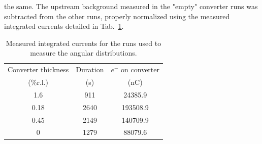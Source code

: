 the same. The upstream background measured in the "empty" converter runs was subtracted 
from the other runs, properly normalized using the measured integrated currents detailed in 
Tab.~\ref{tab:currents}.
\begin{table}
\centering
\begin{tabular}{|c|c|c|}
\hline
Converter thickness & Duration &  $e^-$ on converter \\
 (\%r.l.) & (s) & (nC)    \\   
\hline
1.6   & 911 &     24385.9     \\
0.18   & 2640 &    193508.9  \\
0.45  & 2149 &       140709.9  \\
0    & 1279  &   88079.6  \\
\hline
\end{tabular}
\caption{{\small Measured integrated currents for the runs used to measure the angular distributions.}}
\label{tab:currents}
\end{table}
